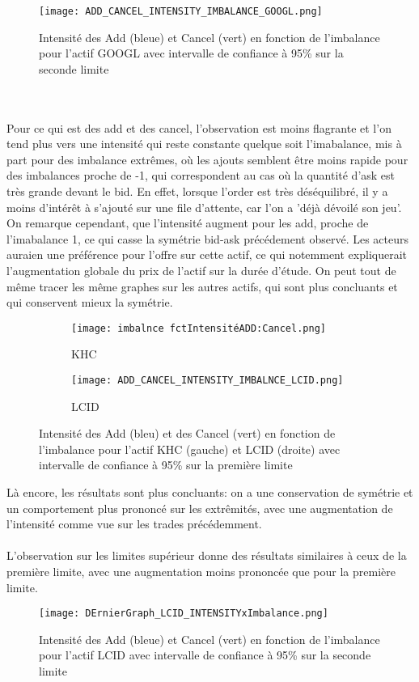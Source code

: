 \documentclass[12pt,a4paper]{article}
\theoremstyle{definition}
\theoremstyle{remark}
\begin{document}
\begin{figure}[h!]
    \centering
    \texttt{[image: ADD\_CANCEL\_INTENSITY\_IMBALANCE\_GOOGL.png]}
    \caption{Intensité des Add (bleue) et Cancel (vert) en fonction de l'imbalance pour l'actif GOOGL avec intervalle de confiance à 95\% sur la seconde limite}
    \label{fig:trades}
\end{figure}
\\
\\
Pour ce qui est des add et des cancel, l'observation est moins flagrante et l'on tend plus vers une intensité qui reste constante quelque soit l'imabalance, mis à part pour des imbalance extrêmes, où les ajouts semblent être moins rapide pour des imbalances proche de -1, qui correspondent au cas où la quantité d'ask est très grande devant le bid. En effet, lorsque l'order est très déséquilibré, il y a moins d'intérêt à s'ajouté sur une file d'attente, car l'on a 'déjà dévoilé son jeu'. On remarque cependant, que l'intensité augment pour les add, proche de l'imabalance 1, ce qui casse la symétrie bid-ask précédement observé. Les acteurs auraien une préférence pour l'offre sur cette actif, ce qui notemment expliquerait l'augmentation globale du prix de l'actif sur la durée d'étude. On peut tout de même tracer les même graphes sur les autres actifs, qui sont plus concluants et qui conservent mieux la symétrie.
\begin{figure}[h!]
    \centering
    \begin{subfigure}[b]{0.48\textwidth}
        \centering
        \texttt{[image: imbalnce fctIntensitéADD:Cancel.png]}
        \caption{KHC}
        \label{fig:imbalance}
    \end{subfigure}
    \hfill
    \begin{subfigure}[b]{0.48\textwidth}
        \centering
        \texttt{[image: ADD\_CANCEL\_INTENSITY\_IMBALNCE\_LCID.png]}
        \caption{LCID}
        \label{fig:densite_imbalance}
    \end{subfigure}
    \caption{Intensité des Add (bleu) et des Cancel (vert) en fonction de l'imbalance pour l'actif KHC (gauche) et LCID (droite) avec intervalle de confiance à 95\% sur la première limite}
    \label{fig:comparison}
\end{figure}
Là encore, les résultats sont plus concluants: on a une conservation de symétrie et un comportement plus prononcé sur les extrêmités, avec une augmentation de l'intensité comme vue sur les trades précédemment.
\\
\\
L'observation sur les limites supérieur donne des résultats similaires à ceux de la première limite, avec une augmentation moins prononcée que pour la première limite.
\begin{figure}[h!]
    \centering
    \texttt{[image: DErnierGraph\_LCID\_INTENSITYxImbalance.png]}
    \caption{Intensité des Add (bleue) et Cancel (vert) en fonction de l'imbalance pour l'actif LCID avec intervalle de confiance à 95\% sur la seconde limite}
    \label{fig:trades}
\end{figure}
\end{document}
